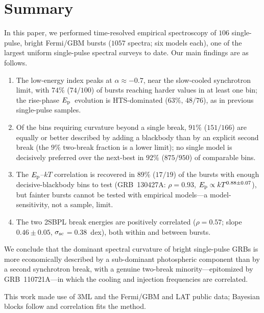 \documentclass[twocolumn]{aastex631}
\newcommand{\Ep}{\ensuremath{E_{\rm p}}}
\newcommand{\kT}{\ensuremath{kT}}
\newcommand{\ssc}{\ensuremath{\sigma_{\rm sc}}}
\begin{document}
\section{Summary} \label{sec:summary}
In this paper, we performed time-resolved empirical spectroscopy of $106$
single-pulse, bright Fermi/GBM bursts ($1057$ spectra; six models each), one
of the largest uniform single-pulse spectral surveys to date. Our main findings
are as follows.
\begin{enumerate}
\item The low-energy index peaks at $\alpha\approx-0.7$, near the slow-cooled
  synchrotron limit, with $74\%$ ($74/100$) of bursts reaching harder values in
  at least one bin; the rise-phase \Ep\ evolution is HTS-dominated
  ($63\%$, $48/76$), as in previous single-pulse samples.
\item Of the bins requiring curvature beyond a single break, $91\%$ ($151/166$)
  are equally or better described by adding a blackbody than by an explicit
  second break (the $9\%$ two-break fraction is a lower limit); no single model
  is decisively preferred over the next-best in $92\%$ ($875/950$) of
  comparable bins.
\item The \citet{Burgess2014a} $\Ep$--$\kT$ correlation is recovered in $89\%$
  ($17/19$) of the bursts with enough decisive-blackbody bins to test
  (GRB~130427A: $\rho=0.93$, $\Ep\propto\kT^{0.88\pm0.07}$), but fainter bursts
  cannot be tested with empirical models---a model-sensitivity, not a sample,
  limit.
\item The two 2SBPL break energies are positively correlated ($\rho=0.57$;
  \citealt{DAgostini2005} slope $0.46\pm0.05$, \ssc$=0.38$~dex), both within
  and between bursts.
\end{enumerate}
We conclude that the dominant spectral curvature of bright single-pulse GRBs is
more economically described by a sub-dominant photospheric component than by a
second synchrotron break, with a genuine two-break minority---epitomized by
GRB~110721A---in which the cooling and injection frequencies are correlated.


\begin{acknowledgments}
This work made use of \textsf{3ML} \citep{Vianello2015} and the Fermi/GBM and LAT
public data; Bayesian blocks follow \citet{Scargle2013} and correlation fits the
\citet{DAgostini2005} method.
\end{acknowledgments}
\end{document}
